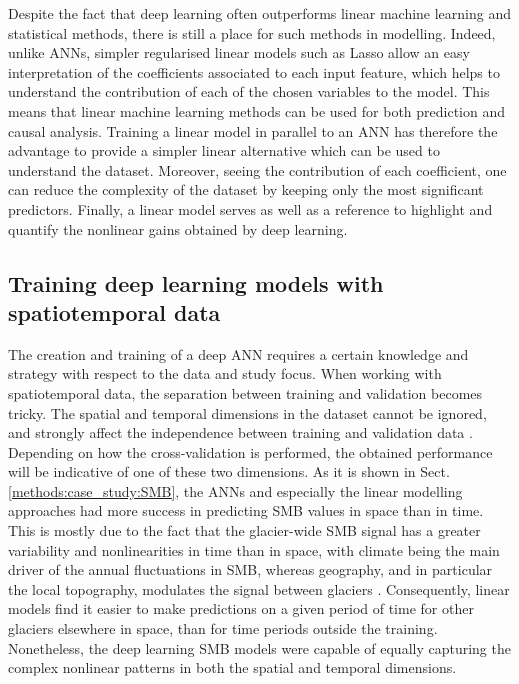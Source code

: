 Despite the fact that deep learning often outperforms linear machine learning and statistical methods, there is still a place for such methods in modelling. Indeed, unlike ANNs, simpler regularised linear models such as Lasso allow an easy interpretation of the coefficients associated to each input feature, which helps to understand the contribution of each of the chosen variables to the model. This means that linear machine learning methods can be used for both prediction and causal analysis. Training a linear model in parallel to an ANN has therefore the advantage to provide a simpler linear alternative which can be used to understand the dataset. Moreover, seeing the contribution of each coefficient, one can reduce the complexity of the dataset by keeping only the most significant predictors. Finally, a linear model serves as well as a reference to highlight and quantify the nonlinear gains obtained by deep learning. 

\subsection{Training deep learning models with spatiotemporal data} \label{methods:spatiotemporal}

The creation and training of a deep ANN requires a certain knowledge and strategy with respect to the data and study focus. When working with spatiotemporal data, the separation between training and validation becomes tricky. The spatial and temporal dimensions in the dataset cannot be ignored, and strongly affect the independence between training and validation data \citep{roberts_cross-validation_2017, berlingerio_evaluation_2019}. Depending on how the cross-validation is performed, the obtained performance will be indicative of one of these two dimensions. As it is shown in Sect. \ref{methods:case_study:SMB}, the ANNs and especially the linear modelling approaches had more success in predicting SMB values in space than in time. This is mostly due to the fact that the glacier-wide SMB signal has a greater variability and nonlinearities in time than in space, with climate being the main driver of the annual fluctuations in SMB, whereas geography, and in particular the local topography, modulates the signal between glaciers \citep{huss_extrapolating_2012, rabatel_spatio-temporal_2016, vincent_common_2017}. Consequently, linear models find it easier to make predictions on a given period of time for other glaciers elsewhere in space, than for time periods outside the training. Nonetheless, the deep learning SMB models were capable of equally capturing the complex nonlinear patterns in both the spatial and temporal dimensions. 

